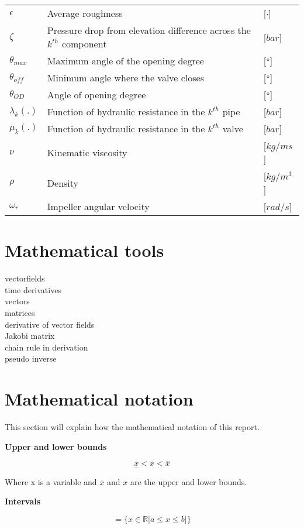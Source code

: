 \begin{tabular}{l l l}
	$\epsilon$		&	Average roughness									     	& [$\cdot$]\\
	$\zeta$			&	Pressure drop from elevation difference across the $k^{th}$ component	& [$bar$]\\
	$\theta_{max}$	&	Maximum angle of the opening degree						    & [$\degree$]\\
	$\theta_{off}$	&	Minimum angle where the valve closes						& [$\degree$]\\
	$\theta_{OD}$	&	Angle of opening degree										& [$\degree$]\\
	$\lambda_k(.)$	&	Function of hydraulic resistance in the $k^{th}$ pipe		& [$bar$]\\
	$\mu_k(.)$		&	Function of hydraulic resistance in the $k^{th}$ valve		& [$bar$]\\
	$\nu$			&	Kinematic viscosity									     	& [$kg/ms$]\\
	$\rho$			&	Density									     				& [$kg/m^3$]\\
	$\omega_r$		&	Impeller angular velocity									& [$rad/s$]\\
	
\end{tabular}

\section*{Mathematical tools}
vectorfields
\\
time derivatives
\\
vectors
\\
matrices
\\
derivative of vector fields
\\
Jakobi matrix
\\
chain rule in derivation
\\
pseudo inverse



\section*{Mathematical notation}

This section will explain how the mathematical notation of this report. 

\textbf{Upper and lower bounds}




\begin{equation}
\underline{x} < x < \overline{x}
\end{equation}

 Where x is a variable and $\overline{x}$ and $\underline{x}$ are the upper and lower bounds.

\textbf{Intervals}

\begin{equation}
	[a,b] =  \{x \in \mathbb{R}|a\leq x \leq b|\}
\end{equation}




